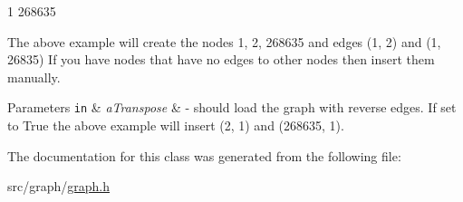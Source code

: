 1 268635

The above example will create the nodes 1, 2, 268635 and edges (1, 2) and (1, 26835) If you have nodes that have no edges to other nodes then insert them manually. 
\begin{DoxyParams}[1]{Parameters}
\mbox{\tt in}  & {\em a\+Transpose} & -\/ should load the graph with reverse edges. If set to True the above example will insert (2, 1) and (268635, 1). \\
\hline
\end{DoxyParams}


The documentation for this class was generated from the following file\+:\begin{DoxyCompactItemize}
\item 
src/graph/\hyperlink{graph_8h}{graph.\+h}\end{DoxyCompactItemize}
